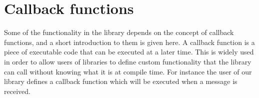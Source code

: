 \section{Callback functions}
\label{callbackfunctions}
Some of the functionality in the library depends on the concept of callback functions, and a short introduction to them is given here.
A callback function is a piece of executable code that can be executed at a later time. This is widely used in order to allow users of libraries to define custom functionality that the library can call without knowing what it is at compile time. For instance the user of our library defines a callback function which will be executed when a message is received.